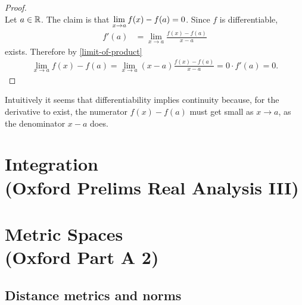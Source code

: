\begin{proof}~\\
  Let $a \in \mathbb{R}$. The claim is that $\limxa f(x) - f(a) = 0$. Since $f$ is differentiable,
  \begin{align*}
    f'(a) &= \lim_{x \to a} \frac{f(x) - f(a)}{x - a}
  \end{align*}
  exists. Therefore by \eqref{limit-of-product}
  \begin{align*}
    \lim_{x \to a} f(x) - f(a) = \lim_{x \to a} (x - a)\frac{f(x) - f(a)}{x - a} = 0\cdot f'(a) = 0.
  \end{align*}
\end{proof}

\begin{remark*}
  Intuitively it seems that differentiability implies continuity because, for the derivative to
  exist, the numerator $f(x) - f(a)$ must get small as $x\to a$, as the denominator $x - a$ does.
\end{remark*}


\newpage
\section{Integration\\(Oxford Prelims Real Analysis III)}
\section{Metric Spaces\\(Oxford Part A 2)}


\subsection{Distance metrics and norms}

